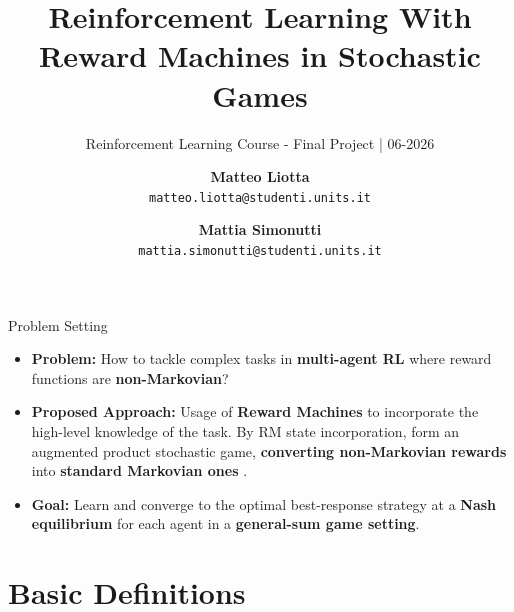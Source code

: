 \documentclass[10pt, aspectratio=169]{beamer}
\title{Reinforcement Learning With Reward Machines in Stochastic Games}
\subtitle{\small Reinforcement Learning Course - Final Project | 06-2026}
\author[M. Liotta \and M. Simonutti]{%
  \hspace{1cm} %
  \begin{tabular}{@{}c@{}}
    \textbf{Matteo Liotta} \\ 
    \footnotesize\texttt{matteo.liotta@studenti.units.it}
  \end{tabular}
  \and
  \hfill %
  \begin{tabular}{@{}c@{}}
    \textbf{Mattia Simonutti} \\ 
    \footnotesize\texttt{mattia.simonutti@studenti.units.it}
  \end{tabular}
  \hspace{1cm} %
}
\institute[UniTS]{%
  \centering
  University of Trieste \\
  \textit{Department of Mathematics and Geosciences}
}
\date[2026]{}
\newcommand{\evidenzia}[1]{\textcolor{verdeSalvia}{\textbf{#1}}}
\begin{document}
\frame{\titlepage}

\begin{frame}{Problem Setting}
    \begin{itemize}
        \item \textbf{Problem:} How to tackle complex tasks in \evidenzia{multi-agent RL} where reward functions are \evidenzia{non-Markovian}?
        \item \textbf{Proposed Approach:} Usage of \evidenzia{Reward Machines} to incorporate the high-level knowledge of the task. By RM state incorporation, form an augmented product stochastic game, \evidenzia{converting non-Markovian rewards} into \evidenzia{standard Markovian ones} \cite{hu2023reinforcement}.
        \item \textbf{Goal:} Learn and converge to the optimal best-response strategy at a \evidenzia{Nash equilibrium} for each agent in a \evidenzia{general-sum game setting}.
    \end{itemize}
\end{frame}

\section{Basic Definitions}
\end{document}

